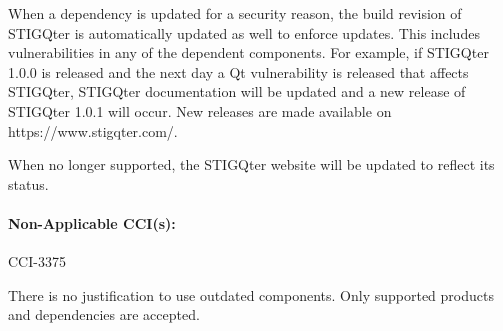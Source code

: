 \documentclass[letterpaper, 10pt, twoside]{article}
\begin{document}
When a dependency is updated for a security reason, the build revision of STIGQter is automatically updated as well to enforce updates. This includes vulnerabilities in any of the dependent components. For example, if STIGQter 1.0.0 is released and the next day a Qt vulnerability is released that affects STIGQter, STIGQter documentation will be updated and a new release of STIGQter 1.0.1 will occur. New releases are made available on https://www.stigqter.com/.

When no longer supported, the STIGQter website will be updated to reflect its status.

\paragraph{Non-Applicable CCI(s):} CCI-3375

There is no justification to use outdated components. Only supported products and dependencies are accepted.

\clearpage
\printbibliography
\end{document}
